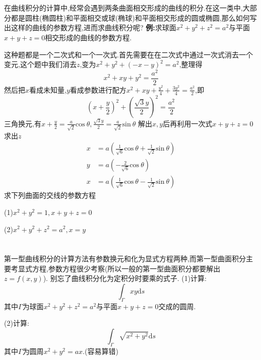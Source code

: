 \documentclass{ctexart}
\begin{document}
\tableofcontents
\newpage

\section{}

在曲线积分的计算中,经常会遇到两条曲面相交形成的曲线的积分.在这一类中,大部分都是圆柱(椭圆柱)和平面相交或球(椭球)和平面相交形成的圆或椭圆,那么如何写出这样的曲线的参数方程,进而求曲线积分呢?
\newline
\newline
\textbf{例:}求球面$x^{2}+y^{2}+z^{2}=a^{2}$与平面$x+y+z=0$相交形成的曲线的参数方程.

这种题都是一个二次式和一个一次式.首先需要在在二次式中通过一次式消去一个变元,这个题中我们消去$z$,变为$x^{2}+y^{2}+(-x-y)^{2}=a^{2}$,整理得
$$x^{2}+xy+y^{2}=\frac{a^{2}}{2}$$
然后把$x$看成未知量,$y$看成参数进行配方$x^{2}+xy+\frac{y^{2}}{4}+\frac{3y^{2}}{4}=\frac{a^{2}}{2}$,即
$$\left(x+\frac{y}{2}\right)^{2}+\left(\frac{\sqrt{3}y}{2}\right)^{2}=\frac{a^{2}}{2}$$
三角换元,有$x+\frac{y}{2}=\frac{a}{\sqrt{2}}\mathrm{cos}\ \theta,\frac{\sqrt{3}y}{2}=\frac{a}{\sqrt{2}}\mathrm{sin}\ \theta$
解出$x,y$后再利用一次式$x+y+z=0$求出$z$
\begin{align}
x&=a\left(\frac{1}{\sqrt{6}}\mathrm{cos}\ \theta+\frac{1}{\sqrt{2}}\mathrm{sin}\ \theta\right)\nonumber\\
y&=a\left(-\frac{2}{\sqrt{6}}\mathrm{cos}\ \theta\right)\nonumber\\
x&=a\left(\frac{1}{\sqrt{6}}\mathrm{cos}\ \theta-\frac{1}{\sqrt{2}}\mathrm{sin}\ \theta\right)\nonumber
\end{align}
\newline
\newline
求下列曲面的交线的参数方程

(1)$x^{2}+y^{2}=1,x+y+z=0$

(2)$x^{2}+y^{2}+z^{2}=a^{2},x=y$
\section{}

第一型曲线积分的计算方法有参数换元和化为显式方程两种,而第一型曲面积分主要考显式方程,参数方程很少考察(所以一般的第一型曲面积分都要解出$z=f(x,y)$).
别忘了曲线积分化为定积分时要乘的式子.
(1)计算:$$\int_{\Gamma}xy\mathrm{d}s$$
其中$\Gamma$为球面$x^{2}+y^{2}+z^{2}=a^{2}$与平面$x+y+z=0$交成的圆周.

(2)计算:$$\int_{\Gamma}\sqrt{x^{2}+y^{2}}\mathrm{d}s$$
其中$\Gamma$为圆周$x^{2}+y^{2}=ax$.(容易算错)
\end{document}

